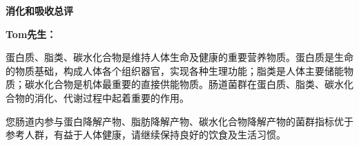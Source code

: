 

\usepackage{graphicx}
\graphicspath{{cores/}}



\setlength{\arrayrulewidth}{0.5pt}
\fontsize{9.3pt}{17pt}\selectfont
\color{gray2}

\vspace*{0mm}
\begin{center}
{\bf\sanhao 消化和吸收总评}
\end{center}

\medskip

\noindent
{\bf\xiaosihao Tom先生：}


\bigskip

蛋白质、脂类、碳水化合物是维持人体生命及健康的重要营养物质。蛋白质是生命的物质基础，构成人体各个组织器官，实现各种生理功能；脂类是人体主要储能物质；碳水化合物是机体最重要的直接供能物质。肠道菌群在蛋白质、脂类、碳水化合物的消化、代谢过程中起着重要的作用。

您肠道内参与蛋白降解产物、脂肪降解产物、碳水化合物降解产物的菌群指标优于参考人群，有益于人体健康，请继续保持良好的饮食及生活习惯。


